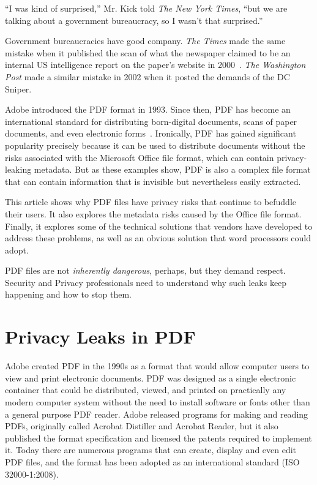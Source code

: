 \documentclass{article}
\begin{document}
``I
was kind of surprised,'' Mr. Kick told \emph{The New York Times}, ``but we are talking about a government
bureaucracy, so I wasn't that surprised.''\cite{nyt-diversity-behind}

Government bureaucracies have good company. \emph{The Times}  made the
same mistake when it published the scan of what the newspaper claimed
to be an internal US intelligence report on the paper's
website in 2000~\cite{nyt-unediting-2003}. \emph{The Washington Post}
  made a similar mistake in 2002 when it posted the demands of the DC Sniper\cite{internet-forensics}.

Adobe introduced the PDF format in 1993. Since then, PDF has become an
international standard for distributing born-digital documents, scans
of paper documents, and even electronic forms~\cite{ISO32000-1:2008}. Ironically, PDF has
gained significant popularity precisely because it can be used to 
distribute documents without the  risks associated with the
Microsoft Office file format, which can contain
privacy-leaking metadata. But as these examples show, PDF is also a complex file
format that can  contain information that is invisible but
nevertheless easily extracted.

This article shows
why PDF files have privacy risks that continue to befuddle their
users. It also explores the
metadata risks caused by the Office file format. Finally, it explores
some of the technical solutions that vendors have developed to address
these problems, as well as an obvious solution that 
word processors could adopt.

PDF files are not \emph{inherently dangerous}, perhaps, but they
demand respect. Security and Privacy professionals need to
understand why such leaks keep happening and how to stop them.

\section{Privacy Leaks in PDF}

Adobe created PDF in the 1990s as a format that would allow computer
users to view and print electronic documents. PDF was designed as a
single electronic container that could be distributed, viewed, and
printed on practically any modern computer system without the need to
install  software or fonts other than a general purpose PDF
reader. Adobe released programs for making and reading PDFs,
originally called Acrobat Distiller and Acrobat Reader, but it also
published the format specification and licensed the patents required
to implement it. Today there are numerous programs that can create,
display and even edit PDF files, and the format has been adopted as an
international standard (ISO 32000-1:2008).
\end{document}
